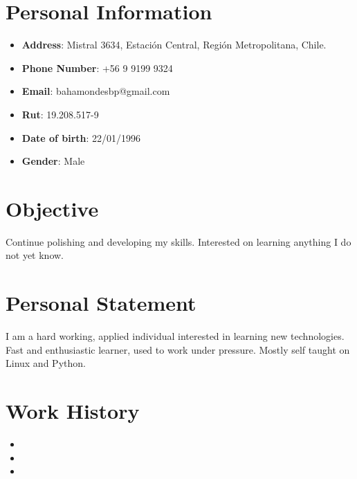 \documentclass[11pt,a4paper,roman]{moderncv}        %
\begin{document}
\makecvtitle
\vspace*{-15mm}

\section{Personal Information}

\begin{itemize}
\item{\textbf{Address}: Mistral 3634, Estación Central, Región Metropolitana, Chile.}
\item{\textbf{Phone Number}: +56 9 9199 9324}
\item{\textbf{Email}: bahamondesbp@gmail.com}
\item{\textbf{Rut}: 19.208.517-9}
\item{\textbf{Date of birth}: 22/01/1996}
\item{\textbf{Gender}: Male}
\end{itemize}

\section{Objective}
\small{ Continue polishing and developing my skills. Interested on learning anything I do not yet know.  }

\section{Personal Statement}
\small{ I am a hard working, applied individual interested in learning new technologies. Fast and enthusiastic learner, used to work under pressure. Mostly self taught on Linux and Python.}

\section{Work History}
\begin{itemize}
\item{}
\vspace{3pt}
\item{}
\vspace{3pt}
\item{}
\end{itemize}
\end{document}
